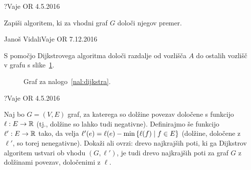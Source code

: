 \begin{naloga}{?}{Vaje OR 4.5.2016}
\begin{vprasanje}
Zapiši algoritem, ki za vhodni graf $G$ določi njegov premer.

\end{vprasanje}
\begin{odgovor}
\end{odgovor}
\end{naloga}


\begin{naloga}{Janoš Vidali}{Vaje OR 7.12.2016}
\begin{vprasanje}
S pomočjo Dijkstrovega algoritma
določi razdalje od vozlišča $A$ do ostalih vozlišč
v grafu s slike~\ref{fig:dijkstra}.

\begin{figure}[t]
\centering
{}
\caption{Graf za nalogo~\ref{nal:dijkstra}.}
\label{fig:dijkstra}
\end{figure}
\end{vprasanje}
\begin{odgovor}
\end{odgovor}
\end{naloga}

\begin{naloga}{?}{Vaje OR 4.5.2016}
\begin{vprasanje}
Naj bo $G = (V, E)$ graf,
za katerega so dolžine povezav določene s funkcijo $\ell : E \to \mathbb{R}$
(tj., dolžine so lahko tudi negativne).
Definirajmo še funkcijo $\ell' : E \to \mathbb{R}$ tako,
da velja $\ell'(e) = \ell(e) - \min\left\{ \ell(f) \; \middle| \; f \in E \right\}$
(dolžine, določene z $\ell'$, so torej nenegativne).
Dokaži ali ovrzi: drevo najkrajših poti,
ki ga Dijkstrov algoritem ustvari ob vhodu $(G, \ell')$,
je tudi drevo najkrajših poti za graf $G$ z dolžinami povezav,
določenimi z $\ell$.
\end{vprasanje}
\begin{odgovor}
\end{odgovor}
\end{naloga}


